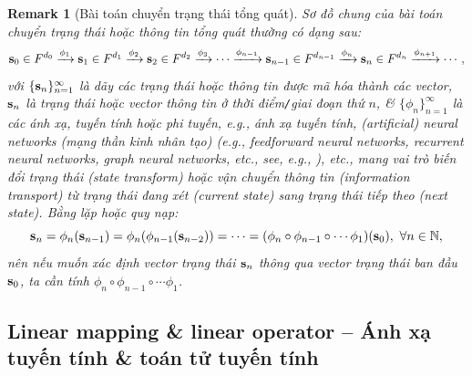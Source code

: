 \documentclass{article}
\newtheorem{remark}{Remark}
\begin{document}
\begin{remark}[Bài toán chuyển trạng thái tổng quát]
	Sơ đồ chung của bài toán chuyển trạng thái hoặc thông tin tổng quát thường có dạng sau:
	\begin{equation*}
		{\bf s}_0\in F^{d_0}\xrightarrow{\phi_1}{\bf s}_1\in F^{d_1}\xrightarrow{\phi_2}{\bf s}_2\in F^{d_2}\xrightarrow{\phi_3}\cdots\xrightarrow{\phi_{n-1}}{\bf s}_{n-1}\in F^{d_{n-1}}\xrightarrow{\phi_n}{\bf s}_n\in F^{d_n}\xrightarrow{\phi_{n+1}}\cdots,
	\end{equation*}
	với $\{{\bf s}_n\}_{n=1}^\infty$ là dãy các trạng thái hoặc thông tin được mã hóa thành các vector, ${\bf s}_n$ là trạng thái hoặc vector thông tin ở thời điểm{\tt/}giai đoạn thứ $n$, \& $\{\phi_n\}_{n=1}^\infty$ là các ánh xạ, tuyến tính hoặc phi tuyến, e.g., ánh xạ tuyến tính, (artificial) neural networks (mạng thần kinh nhân tạo) (e.g., feedforward neural networks, recurrent neural networks, graph neural networks, etc., see, e.g., \cite{Jentzen_Kuckuck_Wurstemberger_DL}), etc., mang vai trò biến đổi trạng thái (state transform) hoặc vận chuyển thông tin (information transport) từ trạng thái đang xét (current state) sang trạng thái tiếp theo (next state). Bằng lặp hoặc quy nạp:
	\begin{equation*}
		{\bf s}_n = \phi_n({\bf s}_{n-1}) = \phi_n(\phi_{n-1}({\bf s}_{n-2})) = \cdots = (\phi_n\circ\phi_{n-1}\circ\cdots\phi_1)({\bf s}_0),\ \forall n\in\mathbb{N},
	\end{equation*}
	nên nếu muốn xác định vector trạng thái ${\bf s}_n$ thông qua vector trạng thái ban đầu ${\bf s}_0$, ta cần tính $\phi_n\circ\phi_{n-1}\circ\cdots\phi_1$.
\end{remark}


\subsection{Linear mapping \& linear operator -- Ánh xạ tuyến tính \& toán tử tuyến tính}
\end{document}

